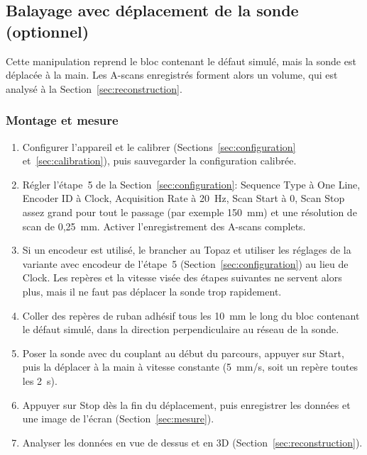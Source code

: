\documentclass[11pt,letterpaper]{article}
\begin{document}
\subsection{Balayage avec d\'eplacement de la sonde (optionnel)}
\label{sec:manip-deplacement}

Cette manipulation reprend le bloc contenant le d\'efaut simul\'e, mais la sonde est d\'eplac\'ee \`a la main. Les A-scans enregistr\'es forment alors un volume, qui est analys\'e \`a la Section~\ref{sec:reconstruction}.

\subsubsection*{Montage et mesure}

\begin{enumerate}
  \item Configurer l'appareil et le calibrer (Sections~\ref{sec:configuration} et~\ref{sec:calibration}), puis sauvegarder la configuration calibr\'ee.
  \item R\'egler l'\'etape~5 de la Section~\ref{sec:configuration}: Sequence Type \`a One Line, Encoder ID \`a Clock, Acquisition Rate \`a 20~Hz, Scan Start \`a 0, Scan Stop assez grand pour tout le passage (par exemple 150~mm) et une r\'esolution de scan de 0,25~mm. Activer l'enregistrement des A-scans complets.
  \item Si un encodeur est utilis\'e, le brancher au Topaz et utiliser les r\'eglages de la variante avec encodeur de l'\'etape~5 (Section~\ref{sec:configuration}) au lieu de Clock. Les rep\`eres et la vitesse vis\'ee des \'etapes suivantes ne servent alors plus, mais il ne faut pas d\'eplacer la sonde trop rapidement.
  \item Coller des rep\`eres de ruban adh\'esif tous les 10~mm le long du bloc contenant le d\'efaut simul\'e, dans la direction perpendiculaire au r\'eseau de la sonde.
  \item Poser la sonde avec du couplant au d\'ebut du parcours, appuyer sur Start, puis la d\'eplacer \`a la main \`a vitesse constante (5~mm/s, soit un rep\`ere toutes les 2~s).
  \item Appuyer sur Stop d\`es la fin du d\'eplacement, puis enregistrer les donn\'ees et une image de l'\'ecran (Section~\ref{sec:mesure}).
  \item Analyser les donn\'ees en vue de dessus et en 3D (Section~\ref{sec:reconstruction}).
\end{enumerate}
\end{document}

